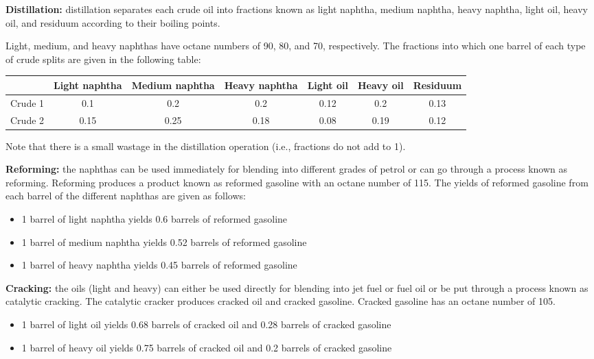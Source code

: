 \documentclass[11pt]{article}
\begin{document}
\textbf{Distillation:} distillation separates each crude oil into fractions known as light naphtha, medium naphtha, heavy naphtha, light oil, heavy oil, and residuum according to their boiling points.

Light, medium, and heavy naphthas have octane numbers of 90, 80, and 70, respectively. The fractions into which one barrel of each type of crude splits are given in the following table:

\begin{tabular}{lcccccc}
    & Light naphtha & Medium naphtha & Heavy naphtha & Light oil & Heavy oil & Residuum \\
    \hline
    Crude 1 & 0.1 & 0.2 & 0.2 & 0.12 & 0.2 & 0.13 \\
    Crude 2 & 0.15 & 0.25 & 0.18 & 0.08 & 0.19 & 0.12 \\
\end{tabular}

Note that there is a small wastage in the distillation operation (i.e., fractions do not add to 1).

\textbf{Reforming:} the naphthas can be used immediately for blending into different grades of petrol or can go through a process known as reforming. Reforming produces a product known as reformed gasoline with an octane number of 115. The yields of reformed gasoline from each barrel of the different naphthas are given as follows:

\begin{itemize}
    \item 1 barrel of light naphtha yields 0.6 barrels of reformed gasoline
    \item 1 barrel of medium naphtha yields 0.52 barrels of reformed gasoline
    \item 1 barrel of heavy naphtha yields 0.45 barrels of reformed gasoline
\end{itemize}

\textbf{Cracking:} the oils (light and heavy) can either be used directly for blending into jet fuel or fuel oil or be put through a process known as catalytic cracking. The catalytic cracker produces cracked oil and cracked gasoline. Cracked gasoline has an octane number of 105.

\begin{itemize}
    \item 1 barrel of light oil yields 0.68 barrels of cracked oil and 0.28 barrels of cracked gasoline
    \item 1 barrel of heavy oil yields 0.75 barrels of cracked oil and 0.2 barrels of cracked gasoline
\end{itemize}
\end{document}
